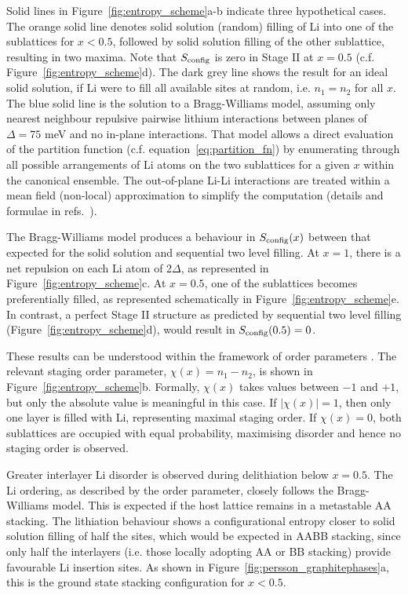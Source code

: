 \documentclass[../main.tex]{subfiles}
\begin{document}
Solid lines in Figure~\ref{fig:entropy_scheme}a-b indicate three hypothetical cases. The orange solid line denotes solid solution (random) filling of Li into one of the sublattices for $x < 0.5$, followed by solid solution filling of the other sublattice, resulting in two maxima. Note that $S_{\rm{config}}$ is zero in Stage II at $x = 0.5$ (c.f. Figure~\ref{fig:entropy_scheme}d). The dark grey line shows the result for an ideal solid solution, if Li were to fill all available sites at random, i.e. $n_{1} = n_{2}$ for all $x$. The blue solid line is the solution to a Bragg-Williams model, \cite{Mercer2019,OTERO2017569} assuming only nearest neighbour repulsive pairwise lithium interactions between planes of $\Delta = 75$ meV and no in-plane interactions. That model allows a direct evaluation of the partition function (c.f. equation~\ref{eq:partition_fn}) by enumerating through all possible arrangements of Li atoms on the two sublattices for a given $x$ within the canonical ensemble. The out-of-plane Li-Li interactions are treated within a mean field (non-local) approximation to simplify the computation (details and formulae in refs.~).

The Bragg-Williams model produces a behaviour in $S_{\rm{config}}(x)$ between that expected for the solid solution and sequential two level filling. At $x = 1$, there is a net repulsion on each Li atom of 2$\Delta$, as represented in Figure~\ref{fig:entropy_scheme}c. At $x = 0.5$, one of the sublattices becomes preferentially filled, as represented schematically in Figure~\ref{fig:entropy_scheme}e. In contrast, a perfect Stage II structure as predicted by sequential two level filling (Figure~\ref{fig:entropy_scheme}d), would result in $S_{\rm{config}}(0.5) = 0$. 

These results can be understood within the framework of order parameters \cite{natarajan2017}. The relevant staging order parameter, $\chi(x) = n_{1} - n_{2}$, is shown in Figure~\ref{fig:entropy_scheme}b.  Formally, $\chi(x)$ takes values between $-1$ and $+1$, but only the absolute value is meaningful in this case. If $|\chi(x)| = 1$, then only one layer is filled with Li, representing maximal staging order. If $\chi(x) = 0$, both sublattices are occupied with equal probability, maximising disorder and hence no staging order is observed.

Greater interlayer Li disorder is observed during delithiation below $x = 0.5$. The Li ordering, as described by the order parameter, closely follows the Bragg-Williams model. This is expected if the host lattice remains in a metastable AA stacking. The lithiation behaviour shows a configurational entropy closer to solid solution filling of half the sites, which would be expected in AABB stacking, since only half the interlayers (i.e. those locally adopting AA or BB stacking) provide favourable Li insertion sites. As shown in Figure~\ref{fig:persson_graphitephases}a, this is the ground state stacking configuration for $x < 0.5$.
\end{document}

